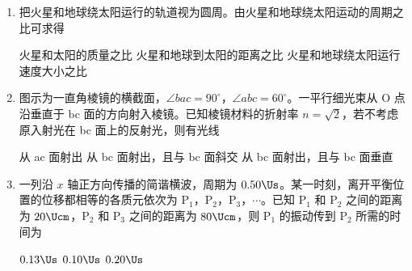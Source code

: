 \documentclass[\gkver]{gaokaozhenti}
\begin{document}
\begin{enumerate}
\item
把火星和地球绕太阳运行的轨道视为圆周。由火星和地球绕太阳运动的周期之比可求得

{火星和太阳的质量之比}
{火星和地球到太阳的距离之比}
{火星和地球绕太阳运行速度大小之比}


\item
图示为一直角棱镜的横截面，$\angle bac=90^\circ$，$\angle abc=60^\circ$。一平行细光束从 O 点沿垂直于 bc 面的方向射入棱镜。已知棱镜材料的折射率 $n=\sqrt{2}$，若不考虑原入射光在 bc 面上的反射光，则有光线


{从 ac 面射出}
{从 bc 面射出，且与 bc 面斜交}
{从 bc 面射出，且与 bc 面垂直}


\item
一列沿 $x$ 轴正方向传播的简谐横波，周期为 $0.50\Us$。某一时刻，离开平衡位置的位移都相等的各质元依次为 P$_{1}$，P$_{2}$，P$_{3}$，$\cdots$。已知 P$_{1}$ 和 P$_{2}$ 之间的距离为 $20\Ucm$，P$_{2}$ 和 P$_{3}$ 之间的距离为 $80\Ucm$，则 P$_{1}$ 的振动传到 P$_{2}$ 所需的时间为

\fourchoices[answer=C]
{$0.50\Us$}
{$0.13\Us$}
{$0.10\Us$}
{$0.20\Us$}


\end{enumerate}
\end{document}
